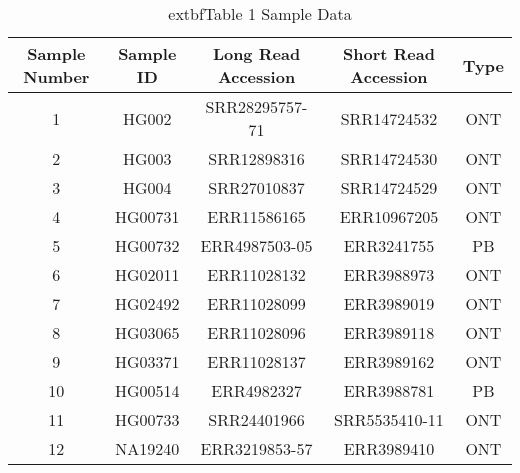 \documentclass[border=1mm]{standalone}
\begin{document}
\begin{table}
\centering
\caption{	extbf{Table 1} Sample Data}
\centering
\fontsize{14}{16}\selectfont
\begin{tabular}[t]{c|c|c|c|c}
\hline
Sample Number & Sample ID & Long Read Accession & Short Read Accession & Type\\
\hline
1 & HG002 & SRR28295757-71 & SRR14724532 & ONT\\
\hline
2 & HG003 & SRR12898316 & SRR14724530 & ONT\\
\hline
3 & HG004 & SRR27010837 & SRR14724529 & ONT\\
\hline
4 & HG00731 & ERR11586165 & ERR10967205 & ONT\\
\hline
5 & HG00732 & ERR4987503-05 & ERR3241755 & PB\\
\hline
6 & HG02011 & ERR11028132 & ERR3988973 & ONT\\
\hline
7 & HG02492 & ERR11028099 & ERR3989019 & ONT\\
\hline
8 & HG03065 & ERR11028096 & ERR3989118 & ONT\\
\hline
9 & HG03371 & ERR11028137 & ERR3989162 & ONT\\
\hline
10 & HG00514 & ERR4982327 & ERR3988781 & PB\\
\hline
11 & HG00733 & SRR24401966 & SRR5535410-11 & ONT\\
\hline
12 & NA19240 & ERR3219853-57 & ERR3989410 & ONT\\
\hline
\end{tabular}
\end{table}
\end{document}
